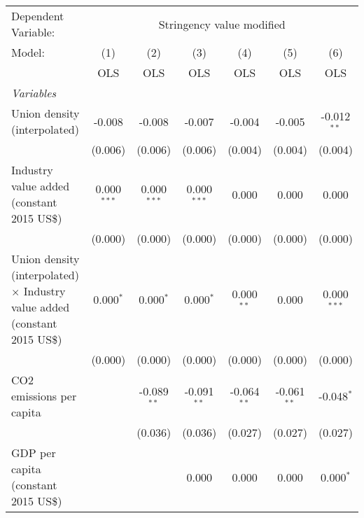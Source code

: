 
\begingroup
\centering
\begin{tabular}{lcccccc}
   \toprule
   Dependent Variable: & \multicolumn{6}{c}{Stringency value modified}\\
   Model:                                                                            & (1)           & (2)           & (3)           & (4)           & (5)           & (6)\\  
                                                                                     &  OLS          & OLS           & OLS           & OLS           & OLS           & OLS\\  
   \midrule
   \emph{Variables}\\
   Union density (interpolated)                                                      & -0.008        & -0.008        & -0.007        & -0.004        & -0.005        & -0.012$^{**}$\\   
                                                                                     & (0.006)       & (0.006)       & (0.006)       & (0.004)       & (0.004)       & (0.004)\\   
   Industry value added (constant 2015 US\$)                                         & 0.000$^{***}$ & 0.000$^{***}$ & 0.000$^{***}$ & 0.000         & 0.000         & 0.000\\   
                                                                                     & (0.000)       & (0.000)       & (0.000)       & (0.000)       & (0.000)       & (0.000)\\   
   Union density (interpolated) $\times$ Industry value added (constant 2015 US\$)   & 0.000$^{*}$   & 0.000$^{*}$   & 0.000$^{*}$   & 0.000$^{**}$  & 0.000         & 0.000$^{***}$\\   
                                                                                     & (0.000)       & (0.000)       & (0.000)       & (0.000)       & (0.000)       & (0.000)\\   
   CO2 emissions per capita                                                          &               & -0.089$^{**}$ & -0.091$^{**}$ & -0.064$^{**}$ & -0.061$^{**}$ & -0.048$^{*}$\\   
                                                                                     &               & (0.036)       & (0.036)       & (0.027)       & (0.027)       & (0.027)\\   
   GDP per capita (constant 2015 US\$)                                               &               &               & 0.000         & 0.000         & 0.000         & 0.000$^{*}$\\   

\end{tabular}
